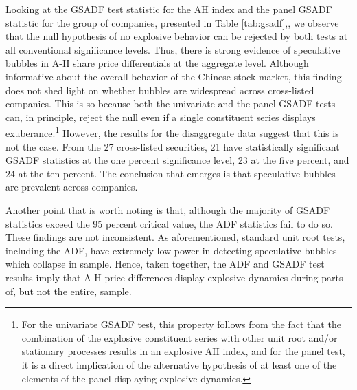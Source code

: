 \documentclass[11pt]{article}
\begin{document}
Looking at the GSADF test statistic for the AH index and the panel GSADF statistic for the group of companies, presented in Table \ref{tab:gsadf},, we observe that the null hypothesis of no explosive behavior can be rejected by both tests at all conventional significance levels. Thus, there is strong evidence of speculative bubbles in A-H share price differentials at the aggregate level. Although informative about the overall behavior of the Chinese stock market, this finding does not shed light on whether bubbles are widespread across cross-listed companies. This is so because both the univariate and the panel GSADF tests can, in principle, reject the null even if a single constituent series displays exuberance.\footnote{For the univariate GSADF test, this property follows from the fact that the combination of the explosive constituent series with other unit root and/or stationary processes results in an explosive AH index, and for the panel test, it is a direct implication of the alternative hypothesis of at least one of the elements of the panel displaying explosive dynamics.} However, the results for the disaggregate data suggest that this is not the case. From the 27 cross-listed securities, 21 have statistically significant GSADF statistics at the one percent significance level, 23 at the five percent, and 24 at the ten percent. The conclusion that emerges is that speculative bubbles are prevalent across companies. 

Another point that is worth noting is that, although the majority of GSADF statistics exceed the 95 percent critical value, the ADF statistics fail to do so. These findings are not inconsistent. As aforementioned, standard unit root tests, including the ADF, have extremely low power in detecting speculative bubbles which collapse in sample. Hence, taken together, the ADF and GSADF test results imply that A-H price differences display explosive dynamics during parts of, but not the entire, sample.


 
\end{document}
